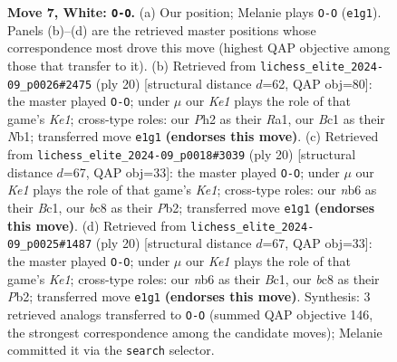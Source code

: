 \documentclass[11pt]{article}
\begin{document}
\begin{figure}[p]
\caption{\textbf{Move 7, White: \texttt{O-O}.} (a) Our position; Melanie plays \texttt{O-O} (\texttt{e1g1}). Panels (b)--(d) are the retrieved master positions whose correspondence most drove this move (highest QAP objective among those that transfer to it). (b) Retrieved from \texttt{lichess\_elite\_2024-09\_p0026\#2475} (ply 20) [structural distance $d$=62, QAP obj=80]: the master played \texttt{O-O}; under $\mu$ our \emph{Ke1} plays the role of that game's \emph{Ke1}; cross-type roles: our \emph{P}h2 as their \emph{R}a1, our \emph{B}c1 as their \emph{N}b1; transferred move \texttt{e1g1} \textbf{(endorses this move)}. (c) Retrieved from \texttt{lichess\_elite\_2024-09\_p0018\#3039} (ply 20) [structural distance $d$=67, QAP obj=33]: the master played \texttt{O-O}; under $\mu$ our \emph{Ke1} plays the role of that game's \emph{Ke1}; cross-type roles: our \emph{n}b6 as their \emph{B}c1, our \emph{b}c8 as their \emph{P}b2; transferred move \texttt{e1g1} \textbf{(endorses this move)}. (d) Retrieved from \texttt{lichess\_elite\_2024-09\_p0025\#1487} (ply 20) [structural distance $d$=67, QAP obj=33]: the master played \texttt{O-O}; under $\mu$ our \emph{Ke1} plays the role of that game's \emph{Ke1}; cross-type roles: our \emph{n}b6 as their \emph{B}c1, our \emph{b}c8 as their \emph{P}b2; transferred move \texttt{e1g1} \textbf{(endorses this move)}. Synthesis: 3 retrieved analogs transferred to \texttt{O-O} (summed QAP objective 146, the strongest correspondence among the candidate moves); Melanie committed it via the \texttt{search} selector.}
\label{fig:thought-m12}
\end{figure}

\clearpage
\end{document}
